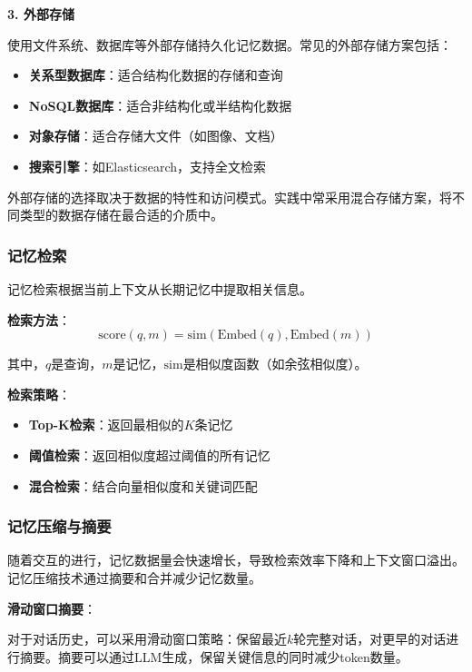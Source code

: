 \textbf{3. 外部存储}

使用文件系统、数据库等外部存储持久化记忆数据。常见的外部存储方案包括：
\begin{itemize}[leftmargin=2em]
    \item \textbf{关系型数据库}：适合结构化数据的存储和查询
    \item \textbf{NoSQL数据库}：适合非结构化或半结构化数据
    \item \textbf{对象存储}：适合存储大文件（如图像、文档）
    \item \textbf{搜索引擎}：如Elasticsearch，支持全文检索
\end{itemize}

外部存储的选择取决于数据的特性和访问模式。实践中常采用混合存储方案，将不同类型的数据存储在最合适的介质中。

\subsubsection{记忆检索}

记忆检索根据当前上下文从长期记忆中提取相关信息。

\textbf{检索方法}：
\begin{equation}
    \text{score}(q, m) = \text{sim}(\text{Embed}(q), \text{Embed}(m))
\end{equation}

其中，$q$是查询，$m$是记忆，$\text{sim}$是相似度函数（如余弦相似度）。

\textbf{检索策略}：
\begin{itemize}[leftmargin=2em]
    \item \textbf{Top-K检索}：返回最相似的$K$条记忆
    \item \textbf{阈值检索}：返回相似度超过阈值的所有记忆
    \item \textbf{混合检索}：结合向量相似度和关键词匹配
\end{itemize}

\subsubsection{记忆压缩与摘要}

随着交互的进行，记忆数据量会快速增长，导致检索效率下降和上下文窗口溢出。记忆压缩技术通过摘要和合并减少记忆数量。

\textbf{滑动窗口摘要}：

对于对话历史，可以采用滑动窗口策略：保留最近$k$轮完整对话，对更早的对话进行摘要。摘要可以通过LLM生成，保留关键信息的同时减少token数量。


